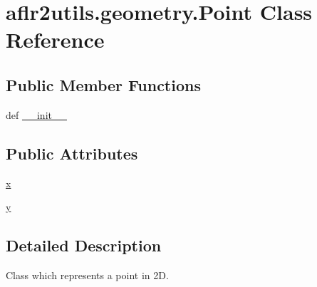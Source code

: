 \hypertarget{classaflr2utils_1_1geometry_1_1Point}{\section{aflr2utils.\-geometry.\-Point Class Reference}
\label{classaflr2utils_1_1geometry_1_1Point}
}
\subsection*{Public Member Functions}
\begin{DoxyCompactItemize}
\item 
def \hyperlink{classaflr2utils_1_1geometry_1_1Point_abbaf17298b62545bf549309cd0a51111}{\-\_\-\-\_\-init\-\_\-\-\_\-}
\end{DoxyCompactItemize}
\subsection*{Public Attributes}
\begin{DoxyCompactItemize}
\item 
\hyperlink{classaflr2utils_1_1geometry_1_1Point_a3351f0527f6d2adf5328c90c4186d25b}{x}
\item 
\hyperlink{classaflr2utils_1_1geometry_1_1Point_afd30feecd23894be929e0fbbf13cbed6}{y}
\end{DoxyCompactItemize}


\subsection{Detailed Description}
\begin{DoxyVerb}Class which represents a point in 2D.\end{DoxyVerb}
 

